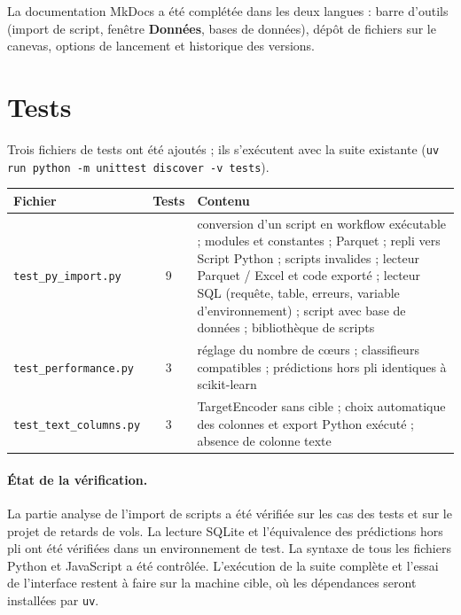 \documentclass[11pt,a4paper]{article}
\newcommand{\code}[1]{\texttt{#1}}
\newcommand{\ui}[1]{\textsf{\textbf{#1}}}   %
\begin{document}
La documentation MkDocs a été complétée dans les deux langues : barre d'outils
(import de script, fenêtre \ui{Données}, bases de données), dépôt de fichiers sur le
canevas, options de lancement et historique des versions.

\section{Tests}

Trois fichiers de tests ont été ajoutés ; ils s'exécutent avec la suite existante
(\code{uv run python -m unittest discover -v tests}).

\begin{center}
\begin{tabularx}{\linewidth}{lcX}
  \toprule
  \textbf{Fichier} & \textbf{Tests} & \textbf{Contenu} \\
  \midrule
  \code{test\_py\_import.py} & 9 &
    conversion d'un script en workflow exécutable ; modules et constantes ; Parquet ;
    repli vers Script Python ; scripts invalides ; lecteur Parquet / Excel et code
    exporté ; lecteur SQL (requête, table, erreurs, variable d'environnement) ;
    script avec base de données ; bibliothèque de scripts \\
  \code{test\_performance.py} & 3 &
    réglage du nombre de cœurs ; classifieurs compatibles ; prédictions hors pli
    identiques à scikit-learn \\
  \code{test\_text\_columns.py} & 3 &
    TargetEncoder sans cible ; choix automatique des colonnes et export Python
    exécuté ; absence de colonne texte \\
  \bottomrule
\end{tabularx}
\end{center}

\paragraph{État de la vérification.} La partie analyse de l'import de scripts a été
vérifiée sur les cas des tests et sur le projet de retards de vols. La lecture SQLite
et l'équivalence des prédictions hors pli ont été vérifiées dans un environnement de
test. La syntaxe de tous les fichiers Python et JavaScript a été contrôlée.
L'exécution de la suite complète et l'essai de l'interface restent à faire sur la
machine cible, où les dépendances seront installées par \code{uv}.
\end{document}
